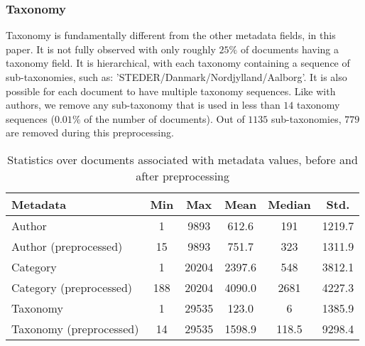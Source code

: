 \subsubsection{Taxonomy}\label{subsec:appendix_taxonomy}
Taxonomy is fundamentally different from the other metadata fields, in this paper.
It is not fully observed with only roughly $25\%$ of documents having a taxonomy field.
It is hierarchical, with each taxonomy containing a sequence of sub-taxonomies, such as: 'STEDER/Danmark/Nordjylland/Aalborg'.
It is also possible for each document to have multiple taxonomy sequences.
Like with authors, we remove any sub-taxonomy that is used in less than $14$ taxonomy sequences ($0.01\%$ of the number of documents).
Out of $1135$ sub-taxonomies, $779$ are removed during this preprocessing.

\begin{table}
	\caption{Statistics over documents associated with metadata values, before and after preprocessing}
	\label{tab:meta_prepro_stats}
	\centering
	\begin{tabular}{l | c | c | c | c | c}
		Metadata & Min & Max & Mean & Median & Std. \\
		\midrule
		Author & 1 & 9893 & 612.6 & 191 & 1219.7 \\
		Author (preprocessed) & 15 & 9893 & 751.7 & 323 & 1311.9 \\
		Category & 1 & 20204 & 2397.6 & 548 & 3812.1 \\
		Category (preprocessed) & 188 & 20204 & 4090.0 & 2681 & 4227.3 \\
		Taxonomy & 1 & 29535 & 123.0 & 6 & 1385.9 \\
		Taxonomy (preprocessed) & 14 & 29535 & 1598.9 & 118.5 & 9298.4 \\
	\end{tabular}
\end{table}



